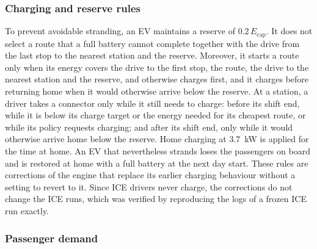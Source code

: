 \subsubsection{Charging and reserve rules}
\label{app:abm_charging}

To prevent avoidable stranding, an EV maintains a reserve of \( 0.2\,E_\mathrm{cap} \). It does not select a route that a full battery cannot complete together with the drive from the last stop to the nearest station and the reserve. Moreover, it starts a route only when its energy covers the drive to the first stop, the route, the drive to the nearest station and the reserve, and otherwise charges first, and it charges before returning home when it would otherwise arrive below the reserve. At a station, a driver takes a connector only while it still needs to charge: before its shift end, while it is below its charge target or the energy needed for its cheapest route, or while its policy requests charging; and after its shift end, only while it would otherwise arrive home below the reserve. Home charging at 3.7~kW is applied for the time at home. An EV that nevertheless strands loses the passengers on board and is restored at home with a full battery at the next day start. These rules are corrections of the engine that replace its earlier charging behaviour without a setting to revert to it. Since ICE drivers never charge, the corrections do not change the ICE runs, which was verified by reproducing the logs of a frozen ICE run exactly.

\subsubsection{Passenger demand}
\label{app:abm_demand}

